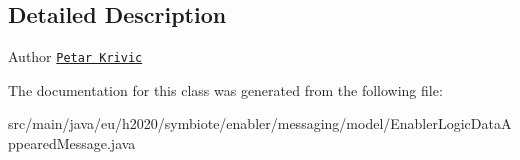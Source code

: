 \subsection{Detailed Description}
\begin{DoxyAuthor}{Author}
\href{mailto:petar.krivic@fer.hr}{\tt Petar Krivic} 
\end{DoxyAuthor}


The documentation for this class was generated from the following file\+:\begin{DoxyCompactItemize}
\item 
src/main/java/eu/h2020/symbiote/enabler/messaging/model/Enabler\+Logic\+Data\+Appeared\+Message.\+java\end{DoxyCompactItemize}
